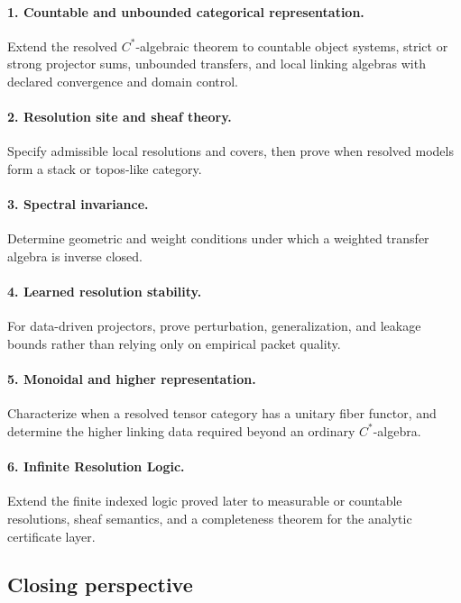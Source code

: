 \documentclass[11pt]{article}
\theoremstyle{definition}
\theoremstyle{remark}
\begin{document}
\paragraph{1. Countable and unbounded categorical representation.}
Extend the resolved $C^*$-algebraic theorem to countable object systems, strict or strong projector sums, unbounded transfers, and local linking algebras with declared convergence and domain control.

\paragraph{2. Resolution site and sheaf theory.}
Specify admissible local resolutions and covers, then prove when resolved models form a stack or topos-like category.

\paragraph{3. Spectral invariance.}
Determine geometric and weight conditions under which a weighted transfer algebra is inverse closed.

\paragraph{4. Learned resolution stability.}
For data-driven projectors, prove perturbation, generalization, and leakage bounds rather than relying only on empirical packet quality.

\paragraph{5. Monoidal and higher representation.}
Characterize when a resolved tensor category has a unitary fiber functor, and determine the higher linking data required beyond an ordinary $C^*$-algebra.

\paragraph{6. Infinite Resolution Logic.}
Extend the finite indexed logic proved later to measurable or countable resolutions, sheaf semantics, and a completeness theorem for the analytic certificate layer.

\subsection{Closing perspective}
\end{document}
